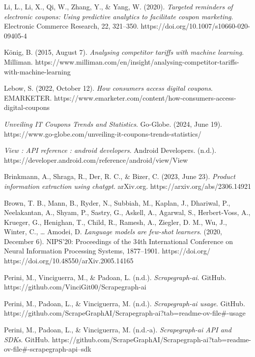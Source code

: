 \documentclass[licencjacka,en]{pracamgr}
\begin{document}
\begin{thebibliography}{99}
Li, L., Li, X., Qi, W., Zhang, Y., \& Yang, W. (2020). \textit{Targeted reminders of electronic coupons: Using predictive analytics to facilitate coupon marketing}. Electronic Commerce Research, 22, 321–350. https://doi.org/10.1007/s10660-020-09405-4 

König, B. (2015, August 7). \textit{Analysing competitor tariffs with machine learning}. Milliman. https://www.milliman.com/en/insight/analysing-competitor-tariffs-with-machine-learning 

Lebow, S. (2022, October 12). \textit{How consumers access digital coupons}. EMARKETER. https://www.emarketer.com/content/how-consumers-access-digital-coupons 

\textit{Unveiling IT Coupons Trends and Statistics}. Go-Globe. (2024, June 19). https://www.go-globe.com/unveiling-it-coupons-trends-statistics/ 

\textit{View :  API reference :  android developers}. Android Developers. (n.d.). https://developer.android.com/reference/android/view/View 

Brinkmann, A., Shraga, R., Der, R. C., \& Bizer, C. (2023, June 23). \textit{Product information extraction using chatgpt}. arXiv.org. https://arxiv.org/abs/2306.14921 

Brown, T. B., Mann, B., Ryder, N., Subbiah, M., Kaplan, J., Dhariwal, P., Neelakantan, A., Shyam, P., Sastry, G., Askell, A., Agarwal, S., Herbert-Voss, A., Krueger, G., Henighan, T., Child, R., Ramesh, A., Ziegler, D. M., Wu, J., Winter, C., … Amodei, D. \textit{Language models are few-shot learners}. (2020, December 6). NIPS’20: Proceedings of the 34th International Conference on Neural Information Processing Systems, 1877–1901. https://doi.org/ https://doi.org/10.48550/arXiv.2005.14165 

Perini, M., Vinciguerra, M., \& Padoan, L. (n.d.). \textit{Scrapegraph-ai}. GitHub. https://github.com/VinciGit00/Scrapegraph-ai 

Perini, M., Padoan, L., \& Vinciguerra, M. (n.d.). \textit{Scrapegraph-ai usage}. GitHub. https://github.com/ScrapeGraphAI/Scrapegraph-ai?tab=readme-ov-file\#-usage 

Perini, M., Padoan, L., \& Vinciguerra, M. (n.d.-a). \textit{Scrapegraph-ai API and SDKs}. GitHub. https://github.com/ScrapeGraphAI/Scrapegraph-ai?tab=readme-ov-file\#-scrapegraph-api--sdk 


\end{thebibliography}
\end{document}
